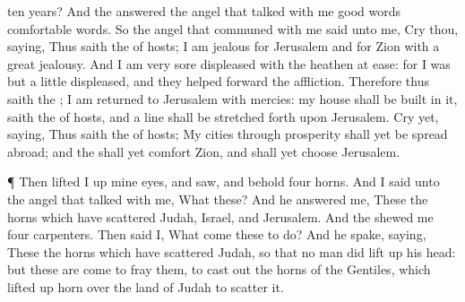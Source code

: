 {ten
years?
And the
{}
answered the
angel that
talked with me
{}
good
words
{}
comfortable
words.
So the
angel that
communed with me
said unto me,
Cry thou,
saying, Thus
saith the
{} of
hosts; I am
jealous for
Jerusalem and for
Zion with a
great
jealousy.
And I am
very
sore
displeased with the
heathen
{} at
ease: for I was but a
little
displeased, and they
helped forward the
affliction.
Therefore thus
saith the
{}; I am
returned to
Jerusalem with
mercies: my
house shall be
built in it,
saith the
{} of
hosts, and a
line shall be stretched
forth upon
Jerusalem.
Cry yet,
saying, Thus
saith the
{} of
hosts; My
cities through
prosperity shall yet be spread
abroad; and the
{} shall yet
comfort
Zion, and shall yet
choose
Jerusalem.
\par }{\PP {}¶ Then lifted I
up mine
eyes, and
saw, and behold
four
horns.
And I
said unto the
angel that
talked with me, What
{} these? And he
answered me, These
{} the
horns which have
scattered
Judah,
Israel, and
Jerusalem.
And the
{}
shewed me
four
carpenters.
Then
said I, What
come these to
do? And he
spake,
saying, These
{} the
horns which have
scattered
Judah, so
that no
man did lift
up his
head: but these are
come to
fray them, to cast
out the
horns of the
Gentiles, which lifted
up
{}
horn over the
land of
Judah to
scatter it.

}

